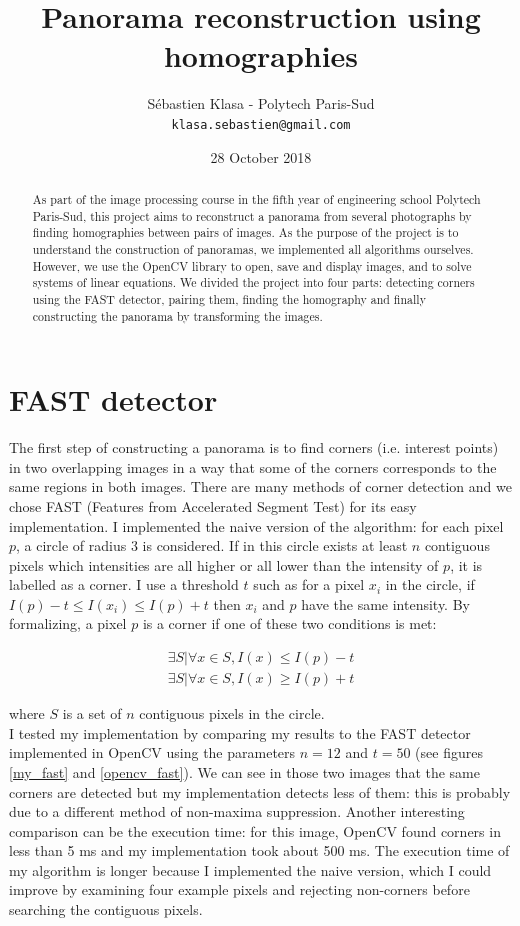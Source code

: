 \documentclass[a4paper,twocolumn]{article}
\title{Panorama reconstruction using homographies}
\author{
	Sébastien Klasa - Polytech Paris-Sud\\
	\texttt{klasa.sebastien@gmail.com}
}
\date{28 October 2018}
\begin{document}
	
\maketitle

\begin{abstract}
	As part of the image processing course in the fifth year of engineering school Polytech Paris-Sud, this project aims to reconstruct a panorama from several photographs by finding homographies between pairs of images. As the purpose of the project is to understand the construction of panoramas, we implemented all algorithms ourselves. However, we use the OpenCV library to open, save and display images, and to solve systems of linear equations. We divided the project into four parts: detecting corners using the FAST detector, pairing them, finding the homography and finally constructing the panorama by transforming the images.
\end{abstract}

\section{FAST detector}

The first step of constructing a panorama is to find corners (i.e. interest points) in two overlapping images in a way that some of the corners corresponds to the same regions in both images. There are many methods of corner detection and we chose FAST (Features from Accelerated Segment Test) for its easy implementation. I implemented the naive version of the algorithm: for each pixel $p$, a circle of radius 3 is considered. If in this circle exists at least $n$ contiguous pixels which intensities are all higher or all lower than the intensity of $p$, it is labelled as a corner. I use a threshold $t$ such as for a pixel $x_i$ in the circle, if $I(p) - t \le I(x_i) \le I(p) + t$ then $x_i$ and $p$ have the same intensity. By formalizing, a pixel $p$ is a corner if one of these two conditions is met:

\begin{align*}
\exists S | \forall x \in S, I(x) \le I(p) - t\\
\exists S | \forall x \in S, I(x) \ge I(p) + t
\end{align*}

where $S$ is a set of $n$ contiguous pixels in the circle.
\\

I tested my implementation by comparing my results to the FAST detector implemented in OpenCV using the parameters $n = 12$ and $t = 50$ (see figures \ref{my_fast} and \ref{opencv_fast}). We can see in those two images that the same corners are detected but my implementation detects less of them: this is probably due to a different method of non-maxima suppression. Another interesting comparison can be the execution time: for this image, OpenCV found corners in less than 5 ms and my implementation took about 500 ms. The execution time of my algorithm is longer because I implemented the naive version, which I could improve by examining four example pixels and rejecting non-corners before searching the contiguous pixels.
\end{document}
